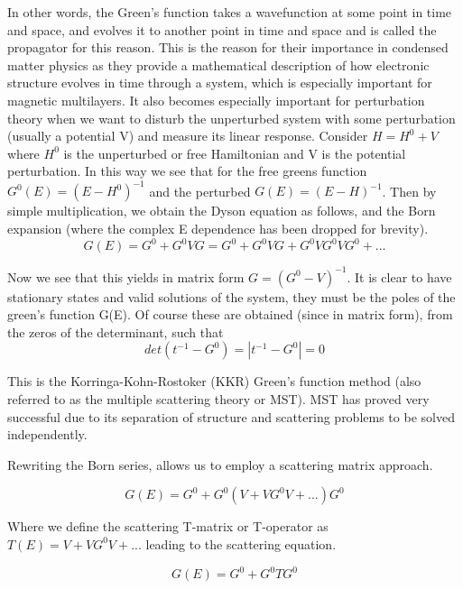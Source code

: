 \documentclass[12pt]{article}
\begin{document}
In other words, the Green's function takes a wavefunction at some point in time and space, and evolves it to another point in time and space and is called the propagator for this reason. This is the reason for their importance in condensed matter physics as they provide a mathematical description of how electronic structure evolves in time through a system, which is especially important for magnetic multilayers. It also becomes especially important for perturbation theory when we want to disturb the unperturbed system with some perturbation (usually a potential V) and measure its linear response. Consider $H=H^0+V$ where $H^0$ is the unperturbed or free Hamiltonian and V is the potential perturbation. In this way we see that for the free greens function $G^0(E)=(E-H^0)^{-1}$ and the perturbed $G(E)=(E-H)^{-1}$. Then by simple multiplication, we obtain the Dyson equation as follows, and the Born expansion (where the complex E dependence has been dropped for brevity).
\begin{equation} \label{4.1} \tag{4.4}
G(E)=G^0+G^0VG=G^0+G^0VG+G^0VG^0VG^0+...
\end{equation}

Now we see that this yields in matrix form $G=(G^0-V)^{-1}$. It is clear to have stationary states and valid solutions of the system, they must be the poles of the green's function G(E). Of course these are obtained (since in matrix form), from the zeros of the determinant, such that
\begin{equation} \label{4.1} \tag{4.5}
det(t^{-1}-G^0)=|t^{-1}-G^0|=0
\end{equation}

This is the Korringa-Kohn-Rostoker (KKR) Green's function method (also referred to as the multiple scattering theory or MST). MST has proved very successful due to its separation of structure and scattering problems to be solved independently. 

Rewriting the Born series, allows us to employ a scattering matrix approach. 

\begin{equation} \label{4.1} \tag{4.6}
G(E)=G^0+G^0(V+VG^0V+...)G^0
\end{equation}

Where we define the scattering T-matrix or T-operator as $T(E)= V+VG^0V+...$ leading to the scattering equation.

\begin{equation} \label{4.1} \tag{4.7}
G(E)=G^0+G^0TG^0
\end{equation}
\end{document}
